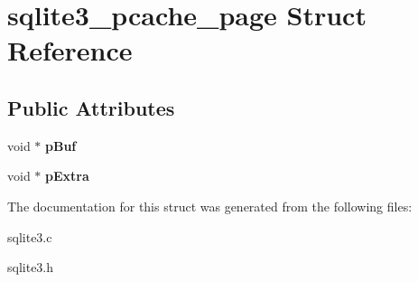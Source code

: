 \hypertarget{structsqlite3__pcache__page}{}\section{sqlite3\+\_\+pcache\+\_\+page Struct Reference}
\label{structsqlite3__pcache__page}
\subsection*{Public Attributes}
\begin{DoxyCompactItemize}
\item 
void $\ast$ {\bfseries p\+Buf}\hypertarget{structsqlite3__pcache__page_aa5446325077c05e4b242c8e2d0faba3b}{}\label{structsqlite3__pcache__page_aa5446325077c05e4b242c8e2d0faba3b}

\item 
void $\ast$ {\bfseries p\+Extra}\hypertarget{structsqlite3__pcache__page_a96d7b0314d02837dd6a5e7057912f74f}{}\label{structsqlite3__pcache__page_a96d7b0314d02837dd6a5e7057912f74f}

\end{DoxyCompactItemize}


The documentation for this struct was generated from the following files\+:\begin{DoxyCompactItemize}
\item 
sqlite3.\+c\item 
sqlite3.\+h\end{DoxyCompactItemize}
